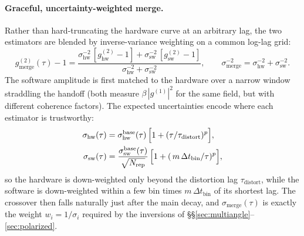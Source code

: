 \documentclass[11pt]{article}
\newcommand{\g}[1]{g^{(#1)}}
\begin{document}
\paragraph{Graceful, uncertainty-weighted merge.}
Rather than hard-truncating the hardware curve at an arbitrary lag, the two
estimators are blended by inverse-variance weighting on a common log-lag grid:
\begin{equation}\label{eq:merge}
  \g2_{\mathrm{merge}}(\tau) - 1 =
  \frac{\sigma_{\mathrm{hw}}^{-2}\,[\g2_{\mathrm{hw}}-1]
        + \sigma_{\mathrm{sw}}^{-2}\,[\g2_{\mathrm{sw}}-1]}
       {\sigma_{\mathrm{hw}}^{-2}+\sigma_{\mathrm{sw}}^{-2}},
  \qquad
  \sigma_{\mathrm{merge}}^{-2}=\sigma_{\mathrm{hw}}^{-2}+\sigma_{\mathrm{sw}}^{-2}.
\end{equation}
The software amplitude is first matched to the hardware over a narrow window
straddling the handoff (both measure $\beta\,|\g1|^2$ for the same field, but
with different coherence factors). The expected uncertainties encode where each
estimator is trustworthy:
\begin{align}
  \sigma_{\mathrm{hw}}(\tau)
    &= \sigma^{\mathrm{base}}_{\mathrm{hw}}(\tau)\,
       \Bigl[1 + (\tau/\tau_{\mathrm{distort}})^{p}\Bigr], \\
  \sigma_{\mathrm{sw}}(\tau)
    &= \frac{\sigma^{\mathrm{base}}_{\mathrm{sw}}(\tau)}{\sqrt{N_{\mathrm{rep}}}}\,
       \Bigl[1 + (\,m\,\Delta t_{\mathrm{bin}}/\tau)^{p}\Bigr],
\end{align}
so the hardware is down-weighted only beyond the distortion lag
$\tau_{\mathrm{distort}}$, while the software is down-weighted within a few bin
times $m\,\Delta t_{\mathrm{bin}}$ of its shortest lag. The crossover then falls
naturally just after the main decay, and $\sigma_{\mathrm{merge}}(\tau)$ is
exactly the weight $w_i=1/\sigma_i$ required by the inversions of
\S\S\ref{sec:multiangle}--\ref{sec:polarized}.
\end{document}
